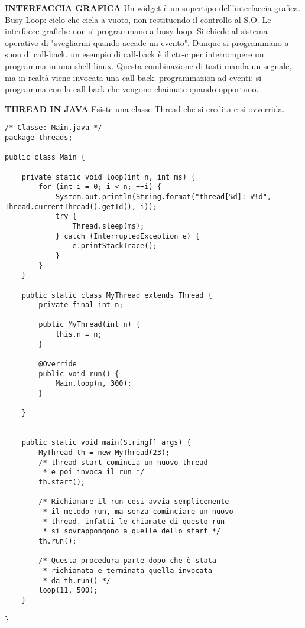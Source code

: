 \noindent \textbf{INTERFACCIA GRAFICA} \newline
Un widget è un supertipo dell'interfaccia grafica. \newline
Busy-Loop: ciclo che cicla a vuoto, non restituendo il controllo al S.O. \newline
Le interfacce grafiche non si programmano a busy-loop. Si chiede al sistema operativo di "svegliarmi quando accade un evento". Dunque si programmano a suon di call-back. \newline
un esempio di call-back è il ctr-c per interrompere un programma in una shell linux. Questa combinazione di tasti manda un segnale, ma in realtà viene invocata una call-back. \newline
programmazion ad eventi: si programma con la call-back che vengono chaimate quando opportuno.

\noindent \textbf{THREAD IN JAVA} \newline
Esiste una classe Thread che si eredita e si ovverrida.



\begin{lstlisting}[basicstyle=\small,]
/* Classe: Main.java */
package threads;

public class Main {

    private static void loop(int n, int ms) {
        for (int i = 0; i < n; ++i) {
            System.out.println(String.format("thread[%d]: #%d", Thread.currentThread().getId(), i));
            try {
                Thread.sleep(ms);
            } catch (InterruptedException e) {
                e.printStackTrace();
            }
        }
    }

    public static class MyThread extends Thread {
        private final int n;

        public MyThread(int n) {
            this.n = n;
        }

        @Override
        public void run() {
            Main.loop(n, 300);
        }

    }


    public static void main(String[] args) {
        MyThread th = new MyThread(23);
        /* thread start comincia un nuovo thread
         * e poi invoca il run */
        th.start();
        
        /* Richiamare il run cosi avvia semplicemente 
         * il metodo run, ma senza cominciare un nuovo 
         * thread. infatti le chiamate di questo run
         * si sovrappongono a quelle dello start */
        th.run();
        
        /* Questa procedura parte dopo che è stata 
         * richiamata e terminata quella invocata
         * da th.run() */
        loop(11, 500);
    }

}


\end{lstlisting}

 

 
